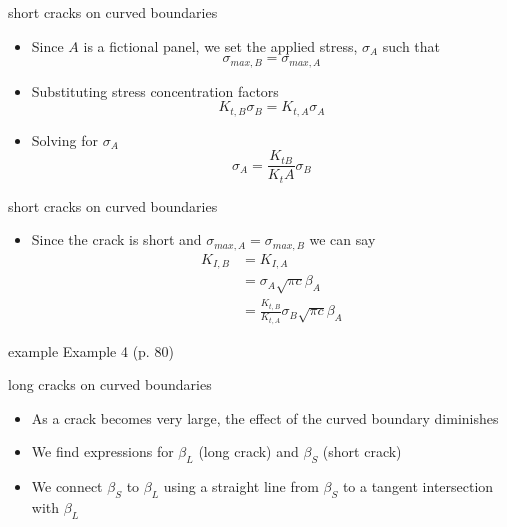 \documentclass[10pt,handout]{beamer}
\begin{document}
\begin{frame}{short cracks on curved boundaries}
	\begin{itemize}
		\item Since $A$ is a fictional panel, we set the applied stress, $\sigma_A$ such that
		\begin{equation*}
		\sigma_{max,B} = \sigma_{max,A}
		\end{equation*}
		\pause
		\item Substituting stress concentration factors
		\begin{equation*}
		K_{t,B} \sigma_B = K_{t,A} \sigma_A
		\end{equation*}
		\pause
		\item Solving for $\sigma_A$
		\begin{equation*}
		\sigma_A = \frac{K_{tB}}{K_tA}\sigma_B
		\end{equation*}
	\end{itemize}
\end{frame}

\begin{frame}{short cracks on curved boundaries}
	\begin{itemize}
		\item Since the crack is short and $\sigma_{max,A} = \sigma_{max,B}$ we can say
		\begin{align*}
		K_{I,B} &= K_{I,A}\\
		&= \sigma_A \sqrt{\pi c} \beta_A\\
		&= \frac{K_{t,B}}{K_{t,A}}\sigma_B \sqrt{\pi c} \beta_A
		\end{align*}
	\end{itemize}
\end{frame}

\begin{frame}{example}
	Example 4 (p. 80)
\end{frame}

\begin{frame}{long cracks on curved boundaries}
	\begin{itemize}
		\item As a crack becomes very large, the effect of the curved boundary diminishes
		\item We find expressions for $\beta_L$ (long crack) and $\beta_S$ (short crack)
		\item We connect $\beta_S$ to $\beta_L$ using a straight line from $\beta_S$ to a tangent intersection with $\beta_L$
	\end{itemize}
\end{frame}
\end{document}

